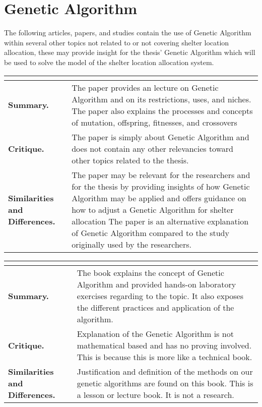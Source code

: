 \section{Genetic Algorithm}

The following articles, papers, and studies contain the use of Genetic Algorithm within several other topics not related to or not covering shelter location allocation, these may provide insight for the thesis' Genetic Algorithm which will be used to solve the model of the shelter location allocation system.

\begin{longtable}{|L{.2\linewidth}|L{.74\linewidth}|}
	\hline
	\\ \hline
	\textbf{Summary.} & The paper provides an lecture on Genetic Algorithm and on its restrictions, uses, and niches. The paper also explains the processes and concepts of mutation, offspring, fitnesses, and crossovers\\ \hline
	\textbf{Critique.} & The paper is simply about Genetic Algorithm and does not contain any other relevancies toward other topics related to the thesis.\\ \hline
	\textbf{Similarities and Differences.} & The paper may be relevant for the researchers and for the thesis by providing insights of how Genetic Algorithm may be applied and offers guidance on how to adjust a Genetic Algorithm for shelter allocation 	The paper is an alternative explanation of Genetic Algorithm compared to the study originally used by the researchers.\\ \hline
\end{longtable}

\begin{longtable}{|L{.2\linewidth}|L{.74\linewidth}|}
	\hline
	\\ \hline
	\textbf{Summary.} & The book explains the concept of Genetic Algorithm and provided hands-on laboratory exercises regarding to the topic. It also exposes the different practices and application of the algorithm. \\ \hline
	\textbf{Critique.} & Explanation of the Genetic Algorithm is not mathematical based and has no proving involved. This is because this is more like a technical book.\\ \hline
	\textbf{Similarities and Differences.} & Justification and definition of the methods on our genetic algorithms are found on this book.	This is a lesson or lecture book. It is not a research. \\ \hline
\end{longtable}

